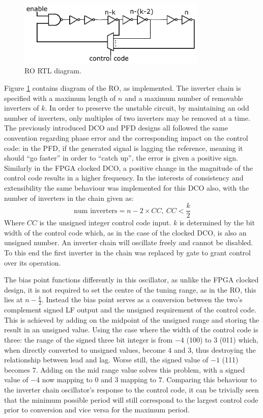 \begin{figure}[h]
    \centering
    \includegraphics[width=0.8\textwidth]{../ro_new}
    \caption[\acl{RO} RTL diagram]{\acl{RO} RTL diagram.}
    \label{fig:ro_impl}
\end{figure}
Figure \ref{fig:ro_impl} contains  diagram of the \ac{RO}, as implemented. The inverter chain is specified with a maximum length of $n$ and a maximum number of removable inverters of $k$. In order to preserve the unstable circuit, by maintaining an odd number of inverters, only multiples of two inverters may be removed at a time. The previously introduced \ac{DCO} and \ac{PFD} designs all followed the same convention regarding phase error and the corresponding impact on the control code: in the \ac{PFD}, if the generated signal is lagging the reference, meaning it should ``go faster'' in order to ``catch up'', the error is given a positive sign. Similarly in the \ac{FPGA} clocked \ac{DCO}, a positive change in the magnitude of the control code results in a higher frequency. In the interests of consistency and extensibility the same behaviour was implemented for this \ac{DCO} also, with the number of inverters in the chain given as:
\begin{equation}
\text{num inverters} = n - 2\times CC,~CC<\frac{k}{2}
\end{equation}
Where $CC$ is the unsigned integer control code input. $k$ is determined by the bit width of the control code which, as in the case of the clocked \ac{DCO}, is also an unsigned number. An inverter chain will oscillate freely and cannot be disabled. To this end the first inverter in the chain was replaced by  gate to grant control over its operation.

The bias point functions differently in this oscillator, as unlike the \ac{FPGA} clocked design, it is not required to set the centre of the tuning range, as in the \ac{RO}, this lies at $n-\frac{k}{2}$. Instead the bias point serves as a conversion between the two's complement signed \ac{LF} output and the unsigned requirement of the control code. This is achieved by adding on the midpoint of the unsigned range and storing the result in an unsigned value. Using the case where the width of the control code is three: the range of the signed three bit integer is from $-4$ (100) to $3$ (011) which, when directly converted to unsigned values, become $4$ and $3$, thus destroying the relationship between lead and lag. Worse still, the signed value of $-1$ (111) becomes $7$. Adding on the mid range value solves this problem, with a signed value of $-4$ now mapping to $0$ and $3$ mapping to $7$. Comparing this behaviour to the inverter chain oscillator's response to the control code, it can be trivially seen that the minimum possible period will still correspond to the largest control code prior to conversion and vice versa for the maximum period.

